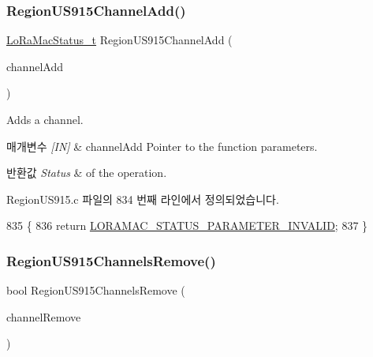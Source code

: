 \subsubsection{\texorpdfstring{Region\+U\+S915\+Channel\+Add()}{RegionUS915ChannelAdd()}}
{\footnotesize\ttfamily \mbox{\hyperlink{group___l_o_r_a_m_a_c_ga30bd25657e10480f8605ee951b0ecfbd}{Lo\+Ra\+Mac\+Status\+\_\+t}} Region\+U\+S915\+Channel\+Add (\begin{DoxyParamCaption}\item[{\mbox{\hyperlink{group___r_e_g_i_o_n_gab1c5f3aa06614283202906cef4417860}{Channel\+Add\+Params\+\_\+t}} $\ast$}]{channel\+Add }\end{DoxyParamCaption})}



Adds a channel. 


\begin{DoxyParams}{매개변수}
{\em \mbox{[}\+I\+N\mbox{]}} & channel\+Add Pointer to the function parameters.\\
\hline
\end{DoxyParams}

\begin{DoxyRetVals}{반환값}
{\em Status} & of the operation. \\
\hline
\end{DoxyRetVals}


Region\+U\+S915.\+c 파일의 834 번째 라인에서 정의되었습니다.


\begin{DoxyCode}
835 \{
836     \textcolor{keywordflow}{return} \mbox{\hyperlink{group___l_o_r_a_m_a_c_gga1d18f26b344040b3ec5c3db662919661ad0d3119f247d00e1787dda106fcb3017}{LORAMAC\_STATUS\_PARAMETER\_INVALID}};
837 \}
\end{DoxyCode}
\mbox{\label{group___r_e_g_i_o_n_u_s915_gace049f46aefc7abb2152b6013ad5c0a6}} 
\subsubsection{\texorpdfstring{Region\+U\+S915\+Channels\+Remove()}{RegionUS915ChannelsRemove()}}
{\footnotesize\ttfamily bool Region\+U\+S915\+Channels\+Remove (\begin{DoxyParamCaption}\item[{\mbox{\hyperlink{group___r_e_g_i_o_n_gaa37468560d2fc81a977b57a48e5d72c0}{Channel\+Remove\+Params\+\_\+t}} $\ast$}]{channel\+Remove }\end{DoxyParamCaption})}



